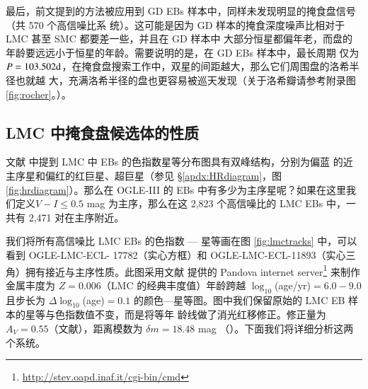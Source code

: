 最后，前文提到的方法被应用到 GD EBs 样本中，同样未发现明显的掩食盘信号（共 570 个高信噪比系
统）。这可能是因为 GD 样本的掩食深度噪声比相对于 LMC 甚至 SMC 都要差一些，并且在 GD 样本中
大部分恒星都偏年老，而盘的年龄要远远小于恒星的年龄。需要说明的是，在 GD EBs 样本中，最长周期
仅为 $P = 103.502 \mathrm{d}$，在掩食盘搜索工作中，双星的间距越大，那么它们周围盘的洛希半径也就越
大，充满洛希半径的盘也更容易被巡天发现（关于洛希瓣请参考附录图 \ref{fig:rocher}。）。

\subsection{LMC 中掩食盘候选体的性质} \label{sec:discebprop}

文献 \cite{Derekas2007,Graczyk2011} 中提到 LMC 中 EBs 的色指数星等分布图具有双峰结构，分别为偏蓝
的近主序星和偏红的红巨星、超巨星（参见 \S \ref{apdx:HRdiagram}，图 \ref{fig:hrdiagram}）。那么在 
OGLE-III 的 EBs 中有多少为主序星呢？如果在这里我们定义$V - I \le 0.5 $ mag 为主序，那么在这 2,823 
个高信噪比的 LMC EBs 中，一共有 2,471 对在主序附近。


我们将所有高信噪比 LMC EBs 的色指数 --- 星等画在图 \ref{fig:lmctracks} 中，可以看到 OGLE-LMC-ECL- 
17782（实心方框）和 OGLE-LMC-ECL-11893（实心三角）拥有接近与主序性质。此图采用文献 
 提供的 Pandova internet server\footnote{\url{http://stev.oapd.inaf.it/cgi-bin/cmd}} 来制作
金属丰度为 $Z=0.006$（LMC 的经典丰度值）年龄跨越 $\log_{10}$(age/yr)$=6.0-9.0$ 且步长为 $\Delta 
\log_{10}$(age)$=0.1$ 的颜色---星等图。图中我们保留原始的 LMC EB 样本的星等与色指数值不变，而是将等年
龄线做了消光红移修正。修正量为 $A_V=0.55$（文献），距离模数为 $\delta m=18.48$ mag 
（）。下面我们将详细分析这两个系统。


